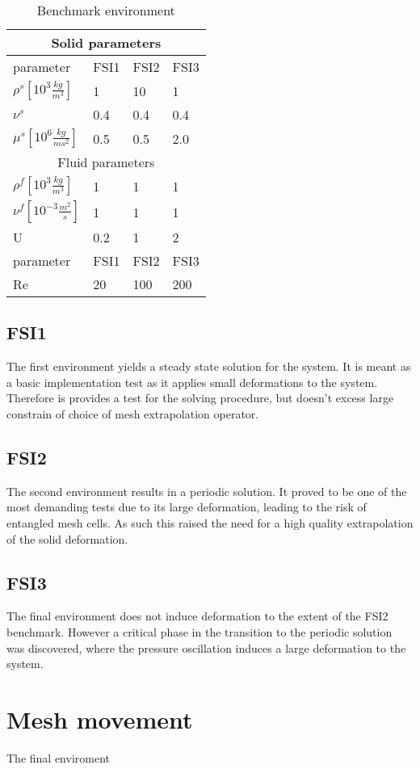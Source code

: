 \begin{table}[h]
\centering
\caption{Benchmark environment}
\label{my-label}
\begin{tabular}{ |p{3cm}||p{3cm}|p{3cm}|p{3cm}|  }
 \hline
 \multicolumn{4}{|c|}{Solid parameters} \\
 \hline
 parameter              & FSI1 & FSI2 & FSI3 \\
 \hline
 $\rho^s [10^{3} \frac{kg}{m^3}]$ & 1    & 10   & 1    \\
$\nu^s$ & 0.4  & 0.4  & 0.4  \\
$\mu^s  [10^{6}\frac{kg}{ms^2}]$  & 0.5  & 0.5  & 2.0  \\
 \hline
 \multicolumn{4}{|c|}{Fluid parameters} \\
 \hline
$\rho^f [10^{3}\frac{kg}{m^3}]$ & 1    & 1    & 1    \\
$\nu^f  [10^{-3}\frac{m^2}{s}]$  & 1    & 1    & 1    \\
U                      & 0.2  & 1    & 2    \\
parameter              & FSI1 & FSI2 & FSI3 \\
Re                     & 20   & 100  & 200 \\
\hline
\end{tabular}
\end{table}


\subsection{FSI1}
The first environment yields a steady state solution for the system. It is meant as a basic implementation test as it applies small deformations to the system. Therefore is provides a test for the solving procedure, but doesn't excess large constrain of choice of mesh extrapolation operator. 

\subsection{FSI2}
The second environment results in a periodic solution. It proved to be one of the most demanding tests due to its large deformation, leading to the risk of entangled mesh cells. As such this raised the need for a high quality extrapolation of the solid deformation.
\\
\subsection{FSI3}    
The final environment does not induce deformation to the extent of the FSI2 benchmark. However a critical phase in the transition to the periodic solution was discovered, where the pressure oscillation induces a large deformation to the system. 


\section{Mesh movement}
The final enviroment 